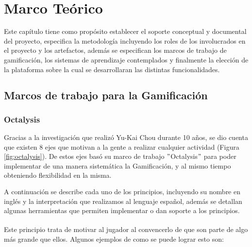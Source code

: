 \chapter{Marco Teórico}
\label{ch:marcoTeorico}

 Este capítulo tiene como propósito establecer el soporte conceptual y documental del proyecto,
 especifica la metodología incluyendo los roles de los involucrados en el proyecto y los artefactos,
 además se especifican los marcos de trabajo de gamificación, los sistemas de aprendizaje contemplados
 y finalmente la elección de la plataforma sobre la cual se desarrollaran las distintas funcionalidades.

 
 

\section{Marcos de trabajo para la Gamificación}
\subsection{Octalysis}
\label{sec:octalysis}

    Gracias a la investigación que realizó Yu-Kai Chou durante 10 años, se dio cuenta que existen 8 ejes que motivan a la gente a realizar cualquier actividad (Figura \ref{fig:octalysis}). De estos ejes basó su marco de trabajo $"$Octalysis$"$ para poder implementar de una manera sistemática la Gamificación, y al mismo tiempo obteniendo flexibilidad en la misma.
    
    
\noindent A continuación se describe cada uno de los principios, incluyendo su nombre en inglés y la interpretación que realizamos al lenguaje español, además se detallan algunas herramientas que permiten implementar o dan soporte a los principios.
    
    \subsubsection{\principioI}
    \label{subsec:principioI}
  
    Este principio trata de motivar al jugador al convencerlo de que son parte de algo más grande que ellos.\cite[p. 66]{libro2} Algunos ejemplos de como se puede lograr esto son:
    
